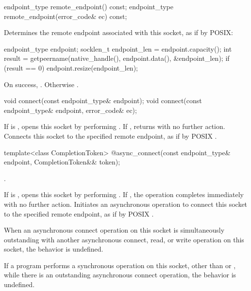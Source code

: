 \begin{itemdecl}
endpoint_type remote_endpoint() const;
endpoint_type remote_endpoint(error_code& ec) const;
\end{itemdecl}

\begin{itemdescr}
\pnum
\effects Determines the remote endpoint associated with this socket, as if by POSIX:
\begin{codeblock}
endpoint_type endpoint;
socklen_t endpoint_len = endpoint.capacity();
int result = getpeername(native_handle(), endpoint.data(), &endpoint_len);
if (result == 0)
  endpoint.resize(endpoint_len);
\end{codeblock}


\pnum
\returns On success, . Otherwise .
\end{itemdescr}

\begin{itemdecl}
void connect(const endpoint_type& endpoint);
void connect(const endpoint_type& endpoint, error_code& ec);
\end{itemdecl}

\begin{itemdescr}
\pnum
\effects If  is , opens this socket by performing . If , returns with no further action. Connects this socket to the specified remote endpoint, as if by POSIX .
\end{itemdescr}

\begin{itemdecl}
template<class CompletionToken>
  @\DEDUCED@ async_connect(const endpoint_type& endpoint, CompletionToken&& token);
\end{itemdecl}

\begin{itemdescr}
\pnum
\completionsig {}.

\pnum
\effects If  is , opens this socket by performing . If , the operation completes immediately with no further action. Initiates an asynchronous operation to connect this socket to the specified remote endpoint, as if by POSIX .

\pnum
 When an asynchronous connect operation on this socket is simultaneously outstanding with another asynchronous connect, read, or write operation on this socket, the behavior is undefined.

\pnum
If a program performs a synchronous operation on this socket, other than  or , while there is an outstanding asynchronous connect operation, the behavior is undefined.
\end{itemdescr}

